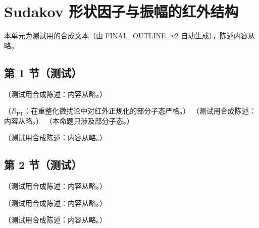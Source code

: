 \chapter{Sudakov 形状因子与振幅的红外结构}\label{ch:sudakov}
本单元为测试用的合成文本（由 FINAL\_OUTLINE\_v2 自动生成），陈述内容从略。

\section{第 1 节（测试）}\label{sec:sudakov-oneloop}

\begin{definition}[夸克形状因子]\label{def:sudakov-ff}
（测试用合成陈述：内容从略。）
\end{definition}

\begin{proposition}\label{prop:sudakov-oneloop}
（$R_{\mathrm{PT}}$：在重整化微扰论中对红外正规化的部分子态严格。）
（测试用合成陈述：内容从略。）
（本命题只涉及部分子态。）
\end{proposition}

\begin{example}[在壳无质量形状因子 = 硬区]\label{ex:sudakov-onshell-hard}
（测试用合成陈述：内容从略。）
\end{example}

\section{第 2 节（测试）}\label{sec:sudakov-regions}

\begin{example}\label{ex:sudakov-offshell}
（测试用合成陈述：内容从略。）
\end{example}

\begin{example}\label{ex:sudakov-massive}
（测试用合成陈述：内容从略。）
\end{example}

\begin{example}[双对数系数]\label{ex:sudakov-ll}
（测试用合成陈述：内容从略。）
\end{example}

